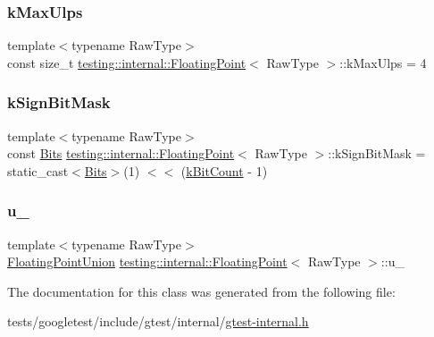 \subsubsection{\texorpdfstring{k\+Max\+Ulps}{kMaxUlps}}
{\footnotesize\ttfamily template$<$typename Raw\+Type$>$ \\
const size\+\_\+t \hyperlink{classtesting_1_1internal_1_1FloatingPoint}{testing\+::internal\+::\+Floating\+Point}$<$ Raw\+Type $>$\+::k\+Max\+Ulps = 4\hspace{0.3cm}{\ttfamily [static]}}

\mbox{\label{classtesting_1_1internal_1_1FloatingPoint_aca98b5ea6f2222a66a82e52421682efa}} 
\subsubsection{\texorpdfstring{k\+Sign\+Bit\+Mask}{kSignBitMask}}
{\footnotesize\ttfamily template$<$typename Raw\+Type$>$ \\
const \hyperlink{classtesting_1_1internal_1_1FloatingPoint_abf228bf6cd48f12c8b44c85b4971a731}{Bits} \hyperlink{classtesting_1_1internal_1_1FloatingPoint}{testing\+::internal\+::\+Floating\+Point}$<$ Raw\+Type $>$\+::k\+Sign\+Bit\+Mask = static\+\_\+cast$<$\hyperlink{classtesting_1_1internal_1_1FloatingPoint_abf228bf6cd48f12c8b44c85b4971a731}{Bits}$>$(1) $<$$<$ (\hyperlink{classtesting_1_1internal_1_1FloatingPoint_ab819d2e8f93e9e482373999f0f8d71b9}{k\+Bit\+Count} -\/ 1)\hspace{0.3cm}{\ttfamily [static]}}

\mbox{\label{classtesting_1_1internal_1_1FloatingPoint_a2e0b6bd427248b91476f3fca281f7104}} 
\subsubsection{\texorpdfstring{u\+\_\+}{u\_}}
{\footnotesize\ttfamily template$<$typename Raw\+Type$>$ \\
\hyperlink{uniontesting_1_1internal_1_1FloatingPoint_1_1FloatingPointUnion}{Floating\+Point\+Union} \hyperlink{classtesting_1_1internal_1_1FloatingPoint}{testing\+::internal\+::\+Floating\+Point}$<$ Raw\+Type $>$\+::u\+\_\+\hspace{0.3cm}{\ttfamily [private]}}



The documentation for this class was generated from the following file\+:\begin{DoxyCompactItemize}
\item 
tests/googletest/include/gtest/internal/\hyperlink{gtest-internal_8h}{gtest-\/internal.\+h}\end{DoxyCompactItemize}
